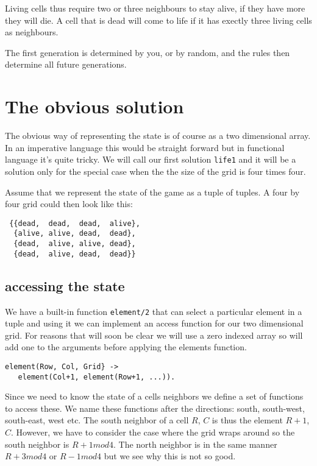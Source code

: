 \documentclass[a4paper,11pt]{article}
\begin{document}
Living cells thus require two or three neighbours to stay alive, if
they have more they will die. A cell that is dead will come to life if
it has exectly three living cells as neighbours.

The first generation is determined by you, or by random, and the rules
then determine all future generations.

\section{The obvious solution}

The obvious way of representing the state is of course as a two
dimensional array. In an imperative language this would be straight
forward but in functional language it's quite tricky. We will call our
first solution {\tt life1} and it will  be a solution only for the
special case when the the size of the grid is four times four.

Assume that we represent the state of the game as a tuple of
tuples. A four by four grid could then look like this:

\begin{verbatim}
 {{dead,  dead,  dead,  alive},
  {alive, alive, dead,  dead},
  {dead,  alive, alive, dead},
  {dead,  alive, dead,  dead}}
\end{verbatim}

\subsection{accessing the state}

We have a built-in function {\tt element/2} that can select a
particular element in a tuple and using it we can implement an access
function for our two dimensional grid. For reasons that will soon be
clear we will use a zero indexed array so will add one to the
arguments before applying the elements function.

\begin{verbatim}
element(Row, Col, Grid} ->
   element(Col+1, element(Row+1, ...)).
\end{verbatim}

Since we need to know the state of a cells neighbors we define a set
of functions to access these. We name these functions after the
directions: south, south-west, south-east, west etc. The south
neighbor of a cell $R$, $C$ is thus the element $R+1$, $C$. However,
we have to consider the case where the grid wraps around so the south
neighbor is $R+1 mod 4$. The north neighbor is in the same manner 
$R + 3 mod 4$ or $R - 1 mod 4$ but we see why this is not so good.
\end{document}
